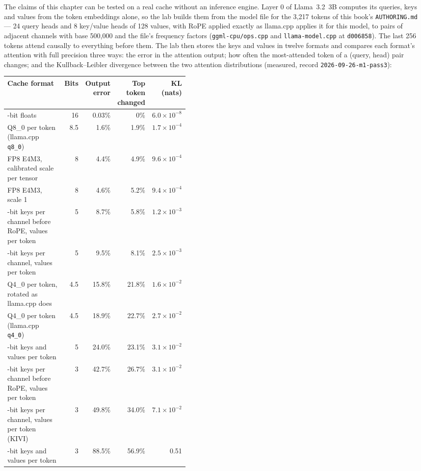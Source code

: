 The claims of this chapter can be tested on a real cache without an inference
engine. Layer 0 of Llama~3.2~3B computes its queries, keys and values from the
token embeddings alone, so the lab builds them from the model file for the
3,217 tokens of this book's \texttt{AUTHORING.md} --- 24 query heads and 8
key/value heads of 128 values, with RoPE applied exactly as llama.cpp applies it
for this model, to pairs of adjacent channels with base 500,000 and the file's
frequency factors (\texttt{ggml-cpu/ops.cpp} and \texttt{llama-model.cpp} at
\texttt{d006858}). The last 256 tokens attend causally to everything before
them. The lab then stores the keys and values in twelve formats and compares
each format's attention with full precision three ways: the error in the
attention output; how often the most-attended token of a (query, head) pair
changes; and the Kullback--Leibler divergence between the two attention
distributions (measured, record \texttt{2026-09-26-m1-pass3}):

\begin{center}\small
\begin{tabular}{@{}>{\raggedright\arraybackslash}p{0.43\linewidth}rrrr@{}}
\toprule
Cache format & Bits & Output error & Top token changed & KL (nats) \\
\midrule
16-bit floats & 16 & 0.03\% & 0\% & $6.0\times10^{-8}$ \\
Q8\_0 per token (llama.cpp \texttt{q8\_0}) & 8.5 & 1.6\% & 1.9\% & $1.7\times10^{-4}$ \\
FP8 E4M3, calibrated scale per tensor & 8 & 4.4\% & 4.9\% & $9.6\times10^{-4}$ \\
FP8 E4M3, scale 1 & 8 & 4.6\% & 5.2\% & $9.4\times10^{-4}$ \\
4-bit keys per channel before RoPE, values per token & 5 & 8.7\% & 5.8\% & $1.2\times10^{-3}$ \\
4-bit keys per channel, values per token & 5 & 9.5\% & 8.1\% & $2.5\times10^{-3}$ \\
Q4\_0 per token, rotated as llama.cpp does & 4.5 & 15.8\% & 21.8\% & $1.6\times10^{-2}$ \\
Q4\_0 per token (llama.cpp \texttt{q4\_0}) & 4.5 & 18.9\% & 22.7\% & $2.7\times10^{-2}$ \\
4-bit keys and values per token & 5 & 24.0\% & 23.1\% & $3.1\times10^{-2}$ \\
2-bit keys per channel before RoPE, values per token & 3 & 42.7\% & 26.7\% & $3.1\times10^{-2}$ \\
2-bit keys per channel, values per token (KIVI) & 3 & 49.8\% & 34.0\% & $7.1\times10^{-2}$ \\
2-bit keys and values per token & 3 & 88.5\% & 56.9\% & 0.51 \\
\bottomrule
\end{tabular}
\end{center}

